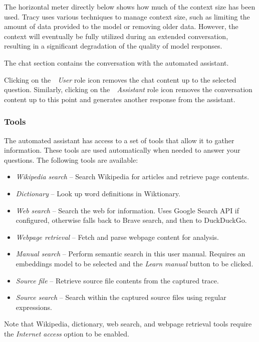 \documentclass[hidelinks,titlepage,a4paper,twoside]{article}
\begin{document}
The horizontal meter directly below shows how much of the context size has been used. Tracy uses various techniques to manage context size, such as limiting the amount of data provided to the model or removing older data. However, the context will eventually be fully utilized during an extended conversation, resulting in a significant degradation of the quality of model responses.

The chat section contains the conversation with the automated assistant.

Clicking on the~\emph{\faUser{}~User} role icon removes the chat content up to the selected question. Similarly, clicking on the~\emph{\faRobot{}~Assistant} role icon removes the conversation content up to this point and generates another response from the assistant.

\subsubsection{Tools}

The automated assistant has access to a set of tools that allow it to gather information. These tools are used automatically when needed to answer your questions. The following tools are available:

\begin{itemize}
\item \emph{Wikipedia search} -- Search Wikipedia for articles and retrieve page contents.
\item \emph{Dictionary} -- Look up word definitions in Wiktionary.
\item \emph{Web search} -- Search the web for information. Uses Google Search API if configured, otherwise falls back to Brave search, and then to DuckDuckGo.
\item \emph{Webpage retrieval} -- Fetch and parse webpage content for analysis.
\item \emph{Manual search} -- Perform semantic search in this user manual. Requires an embeddings model to be selected and the \emph{Learn manual} button to be clicked.
\item \emph{Source file} -- Retrieve source file contents from the captured trace.
\item \emph{Source search} -- Search within the captured source files using regular expressions.
\end{itemize}

Note that Wikipedia, dictionary, web search, and webpage retrieval tools require the \emph{Internet access} option to be enabled.
\end{document}
